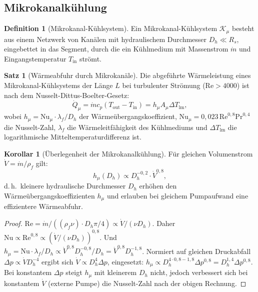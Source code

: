 ﻿\documentclass[a4paper,12pt]{article}
\theoremstyle{definition}
\newtheorem{definition}{Definition}
\newtheorem{satz}{Satz}
\newtheorem{korollar}{Korollar}
\begin{document}
\subsection{Mikrokanalkühlung}
\label{sec:kuehlung}

\begin{definition}[Mikrokanal-Kühlsystem]
Ein Mikrokanal-Kühlsystem $\mathcal{K}_{\mu}$ besteht aus einem Netzwerk von
Kanälen mit hydraulischem Durchmesser $D_h \ll R_s$, eingebettet in das Segment,
durch die ein Kühlmedium mit Massenstrom $\dot{m}$ und Eingangstemperatur $T_{\mathrm{in}}$
strömt.
\end{definition}

\begin{satz}[Wärmeabfuhr durch Mikrokanäle]
\label{satz:mikrokuehl}
Die abgeführte Wärmeleistung eines Mikrokanal-Kühlsystems der Länge $L$ bei turbulenter
Strömung ($\mathrm{Re} > 4000$) ist nach dem Nusselt-Dittus-Boelter-Gesetz:
\begin{equation}
\label{eq:mikrokuehl}
\dot{Q}_{\mu} = \dot{m} c_p (T_{\mathrm{out}} - T_{\mathrm{in}}) = h_{\mu} A_{\mu} \Delta T_{\mathrm{lm}},
\end{equation}
wobei $h_{\mu} = \mathrm{Nu}_{\mu} \cdot \lambda_f / D_h$ der Wärmeübergangskoeffizient,
$\mathrm{Nu}_{\mu} = 0{,}023\,\mathrm{Re}^{0{,}8}\mathrm{Pr}^{0{,}4}$ die Nusselt-Zahl,
$\lambda_f$ die Wärmeleitfähigkeit des Kühlmediums und $\Delta T_{\mathrm{lm}}$ die
logarithmische Mitteltemperaturdifferenz ist.
\end{satz}

\begin{korollar}[Überlegenheit der Mikrokanalkühlung]
\label{kor:mikro}
Für gleichen Volumenstrom $\dot{V} = \dot{m}/\rho_f$ gilt:
\[
h_{\mu}(D_h) \propto D_h^{-0{,}2} \cdot \dot{V}^{0{,}8},
\]
d.\,h.\ kleinere hydraulische Durchmesser $D_h$ erhöhen den Wärmeübergangskoeffizienten $h_{\mu}$
und erlauben bei gleichem Pumpaufwand eine effizientere Wärmeabfuhr.
\end{korollar}

\begin{proof}
$\mathrm{Re} = \dot{m}/((\rho_f \nu) \cdot D_h \pi/4) \propto \dot{V}/(\nu D_h)$.
Daher $\mathrm{Nu} \propto \mathrm{Re}^{0{,}8} \propto (\dot{V}/(\nu D_h))^{0{,}8}$.
Und $h_{\mu} = \mathrm{Nu}\cdot\lambda_f/D_h \propto \dot{V}^{0{,}8} D_h^{-0{,}8}/D_h = \dot{V}^{0{,}8} D_h^{-1{,}8}$.
Normiert auf gleichen Druckabfall $\Delta p \propto \dot{V} D_h^{-4}$ ergibt sich
$\dot{V} \propto D_h^4 \Delta p$, eingesetzt: $h_{\mu} \propto D_h^{4\cdot 0{,}8 - 1{,}8} \Delta p^{0{,}8} = D_h^{1{,}4}\Delta p^{0{,}8}$.
Bei konstantem $\Delta p$ steigt $h_{\mu}$ mit kleinerem $D_h$ nicht, jedoch verbessert
sich bei konstantem $\dot{V}$ (externe Pumpe) die Nusselt-Zahl nach der obigen Rechnung.
\end{proof}
\end{document}
